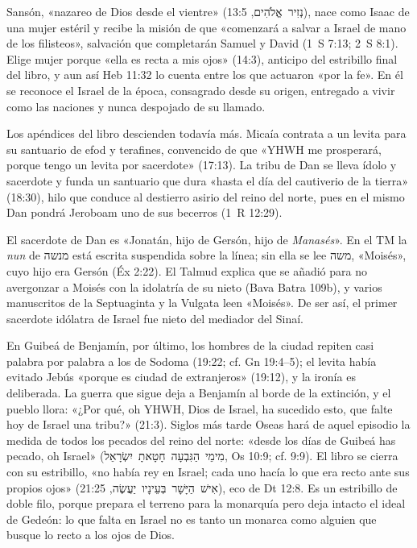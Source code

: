 \documentclass[11pt,letterpaper]{article}
\newcommand{\heb}[1]{\mbox{\foreignlanguage{hebrew}{#1}}}
\begin{document}
Sansón, «nazareo de Dios desde el vientre» (\heb{נְזִיר אֱלֹהִים}, 13:5), nace como Isaac de una mujer estéril y recibe la misión de que «comenzará a salvar a Israel de mano de los filisteos», salvación que completarán Samuel y David (1~S 7:13; 2~S 8:1). Elige mujer porque «ella es recta a mis ojos» (14:3), anticipo del estribillo final del libro, y aun así Heb 11:32 lo cuenta entre los que actuaron «por la fe». En él se reconoce el Israel de la época, consagrado desde su origen, entregado a vivir como las naciones y nunca despojado de su llamado.

Los apéndices del libro descienden todavía más. Micaía contrata a un levita para su santuario de efod y terafines, convencido de que «YHWH me prosperará, porque tengo un levita por sacerdote» (17:13). La tribu de Dan se lleva ídolo y sacerdote y funda un santuario que dura «hasta el día del cautiverio de la tierra» (18:30), hilo que conduce al destierro asirio del reino del norte, pues en el mismo Dan pondrá Jeroboam uno de sus becerros (1~R 12:29).

\begin{nota}
El sacerdote de Dan es «Jonatán, hijo de Gersón, hijo de \emph{Manasés}». En el TM la \emph{nun} de \heb{מנשה} está escrita suspendida sobre la línea; sin ella se lee \heb{משה}, «Moisés», cuyo hijo era Gersón (Éx 2:22). El Talmud explica que se añadió para no avergonzar a Moisés con la idolatría de su nieto (Bava Batra 109b), y varios manuscritos de la Septuaginta y la Vulgata leen «Moisés». De ser así, el primer sacerdote idólatra de Israel fue nieto del mediador del Sinaí.
\end{nota}

En Guibeá de Benjamín, por último, los hombres de la ciudad repiten casi palabra por palabra a los de Sodoma (19:22; cf. Gn 19:4--5); el levita había evitado Jebús «porque es ciudad de extranjeros» (19:12), y la ironía es deliberada. La guerra que sigue deja a Benjamín al borde de la extinción, y el pueblo llora: «¿Por qué, oh YHWH, Dios de Israel, ha sucedido esto, que falte hoy de Israel una tribu?» (21:3). Siglos más tarde Oseas hará de aquel episodio la medida de todos los pecados del reino del norte: «desde los días de Guibeá has pecado, oh Israel» (\heb{מִימֵי הַגִּבְעָה חָטָאתָ יִשְׂרָאֵל}, Os 10:9; cf. 9:9). El libro se cierra con su estribillo, «no había rey en Israel; cada uno hacía lo que era recto ante sus propios ojos» (\heb{אִישׁ הַיָּשָׁר בְּעֵינָיו יַעֲשֶׂה}, 21:25), eco de Dt 12:8. Es un estribillo de doble filo, porque prepara el terreno para la monarquía pero deja intacto el ideal de Gedeón: lo que falta en Israel no es tanto un monarca como alguien que busque lo recto a los ojos de Dios.
\end{document}
